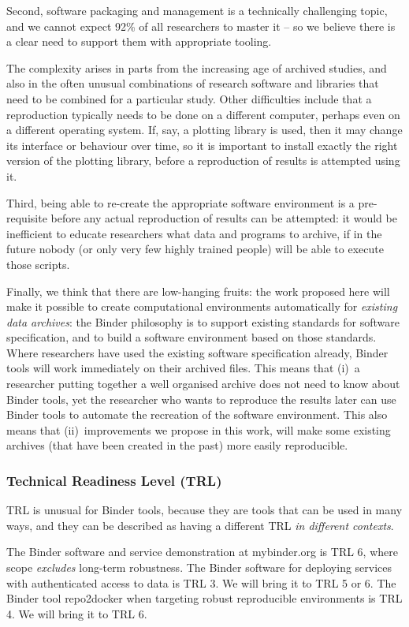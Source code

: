 Second, software packaging and management is a technically challenging topic,
and we cannot expect 92\% of all researchers to master it -- so we believe there
is a clear need to support them with appropriate tooling.

The complexity arises in parts from the increasing age of archived studies, and
also in the often unusual combinations of research software and libraries that
need to be combined for a particular study. Other difficulties include that a
reproduction typically needs to be done on a different computer, perhaps even on
a different operating system. If, say, a plotting library is used, then it may
change its interface or behaviour over time, so it is important to install
exactly the right version of the plotting library, before a reproduction of
results is attempted using it.

Third, being able to re-create the appropriate software environment is a
pre-requisite before any actual reproduction of results can be attempted: it
would be inefficient to educate researchers what data and programs to archive,
if in the future nobody (or only very few highly trained people) will be able to
execute those scripts.

Finally, we think that there are low-hanging fruits: the work proposed here will
make it possible to create computational environments automatically for
\emph{existing data archives}: the Binder philosophy is to support existing standards for software
specification, and to build a software environment based on those standards.
Where researchers have used the existing software specification already, Binder tools
will work immediately on their archived files. This means that (i)~a researcher
putting together a well organised archive does not need to know about Binder tools,
yet the researcher who wants to reproduce the results later can use Binder tools to
automate the recreation of the software environment. This also means that
(ii)~improvements we propose in this work, will make some existing archives (that
have been created in the past) more easily reproducible.







\subsubsection{Technical Readiness Level (TRL)}

TRL is unusual for Binder tools, because they are tools that can be used in many ways,
and they can be described as having a different TRL \emph{in different contexts}.

The Binder software and service demonstration at mybinder.org is TRL 6,
where scope \emph{excludes} long-term robustness.
The Binder software for deploying services with authenticated access to data is TRL 3.
We will bring it to TRL 5 or 6.
The Binder tool repo2docker when targeting robust reproducible environments is TRL 4.
We will bring it to TRL 6.
